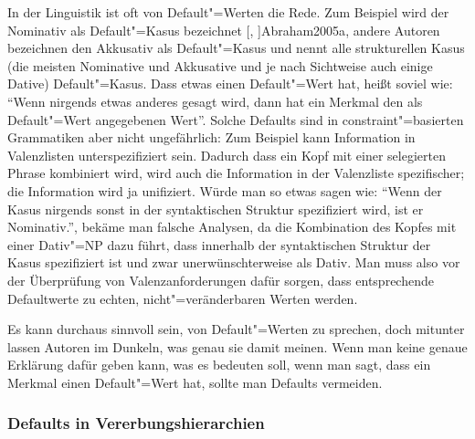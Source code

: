 In der Linguistik ist oft von Default"=Werten die Rede. 
Zum Beispiel wird der Nominativ als Default"=Kasus bezeichnet \parencites[]{Sternefeld95a}[]{Jacobs91a}%
[, ]{Abraham2005a}, %
andere Autoren bezeichnen den Akkusativ als Default"=Kasus \parencites[]{Zwicky86}[]{Hoeksema91c} und \citet[]{Wunderlich93a} nennt alle strukturellen Kasus
(\dash die meisten Nominative und Akkusative und je nach Sichtweise auch einige Dative) Default"=Kasus.
%
Dass etwas einen Default"=Wert hat, heißt soviel wie: "`Wenn nirgends etwas anderes gesagt
wird, dann hat ein Merkmal den als Default"=Wert angegebenen Wert"'. Solche Defaults sind
in constraint"=basierten Grammatiken aber nicht ungefährlich: Zum Beispiel kann Information
in Valenzlisten unterspezifiziert sein. Dadurch dass ein Kopf mit einer selegierten Phrase
kombiniert wird, wird auch die Information in der Valenzliste spezifischer; die
Information wird ja unifiziert. Würde man so etwas sagen wie: "`Wenn der Kasus nirgends
sonst in der syntaktischen Struktur spezifiziert wird, ist er Nominativ."', bekäme man falsche
Analysen, da die Kombination des Kopfes mit einer Dativ"=NP dazu führt, dass innerhalb der
syntaktischen Struktur der Kasus spezifiziert ist und zwar unerwünschterweise als Dativ.
Man muss also vor der Überprüfung von Valenzanforderungen dafür sorgen, dass entsprechende
Defaultwerte zu echten, nicht"=veränderbaren Werten werden.

Es kann durchaus sinnvoll sein, von Default"=Werten zu sprechen, doch mitunter lassen Autoren im Dunkeln,
was genau sie damit meinen. Wenn man keine genaue Erklärung dafür geben kann, 
was es bedeuten soll, wenn man sagt, dass ein Merkmal einen Default"=Wert hat,
sollte man Defaults vermeiden.

\subsubsection{Defaults in Vererbungshierarchien}

